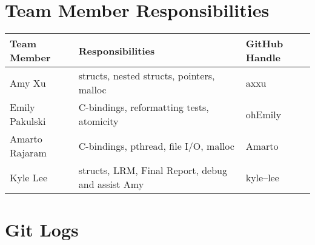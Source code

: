 \section{Team Member Responsibilities}
  

  \begin{tabular}{ | l | l | l |}\hline
    Team Member  & Responsibilities      & GitHub Handle\\ \hline
    Amy Xu & structs, nested structs, pointers, malloc & axxu\\
    Emily Pakulski & C-bindings, reformatting tests, atomicity & ohEmily\\
    Amarto Rajaram & C-bindings, pthread, file I/O, malloc & Amarto\\
    Kyle Lee & structs, LRM, Final Report, debug and assist Amy & kyle--lee\\ \hline
  \end{tabular}

\section{Git Logs}
